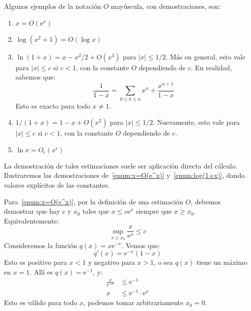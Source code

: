   Algunos ejemplos de la notación \(O\) mayúscula,
  con demostraciones,
  son:
  \begin{enumerate}
  \item
    \label{enum:x=O(e^x)}
    \(x = O(\mathrm{e}^x)\)
  \item
    \label{enum:log(x^2+1)=O(logx)}
    \(\log (x^2 + 1) = O(\log x)\)
  \item
    \label{enum:log(1+x)}
    \(\ln (1 + x) = x - x^2 / 2 + O(x^3)\) para \(\lvert x \rvert \le 1/2\).
    Más en general,
    esto vale para \(\lvert x \rvert \le c\) si \(c < 1\),
    con la constante \(O\) dependiendo de \(c\).
    En realidad,
    sabemos que:
    \begin{equation*}
      \frac{1}{1 - x}
        = \sum_{0 \le k \le n} x^n + \frac{x^{n + 1}}{1 - x}
    \end{equation*}
    Esto es exacto para todo \(x \ne 1\).
  \item
    \label{enum:1/(1+x)}
    \(1 / (1 + x) = 1 - x + O(x^2)\) para \(\lvert x \rvert \le 1/2\).
    Nuevamente,
    esto vale para \(\lvert x \rvert \le c\) si \(c < 1\),
    con la constante \(O\) dependiendo de \(c\).
  \item
    \label{enum:logx}
    \(\ln x = O_\epsilon(x^\epsilon)\)
  \end{enumerate}
  La demostración de tales estimaciones
  suele ser aplicación directa del cálculo.
  Ilustraremos las demostraciones de~\ref{enum:x=O(e^x)} y~\ref{enum:log(1+x)},
  dando valores explícitos de las constantes.

  Para~\ref{enum:x=O(e^x)},
  por la definición de una estimación \(O\),
  debemos demostrar que hay \(c\) y \(x_0\) tales que \(x \le c \mathrm{e}^x\)
  siempre que \(x \ge x_0\).
  Equivalentemente:
  \begin{equation*}
    \sup_{x \ge x_0} \frac{x}{\mathrm{e}^x} \le c
  \end{equation*}
  Consideremos la función \(q(x) = x \mathrm{e}^{-x}\).
  Vemos que:
  \begin{equation*}
    q'(x)
      = \mathrm{e}^{-x} (1 - x)
  \end{equation*}
  Esto es positivo para \(x < 1\) y negativo para \(x > 1\),
  o sea \(q(x)\) tiene un máximo en \(x = 1\).
  Allí es \(q(x) = \mathrm{e}^{-1}\),
  y:
  \begin{align*}
    \frac{x}{\mathrm{e}^{-x}}
      &\le \mathrm{e}^{-1} \\
    x
      &\le \mathrm{e}^{-1} \cdot \mathrm{e}^x
  \end{align*}
  Esto es válido para todo \(x\),
  podemos tomar arbitrariamente \(x_0 = 0\).

